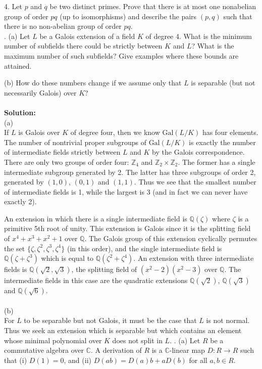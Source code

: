 \documentclass[11pt]{article}
\newcommand{\Z}{\mathbb{Z}}
\newcommand{\Q}{\mathbb{Q}}
\newcommand{\C}{\mathbb{C}}
\begin{document}
4. Let $p$ and $q$ be two distinct primes. Prove that there is at most one nonabelian
group of order $pq$ (up to isomorphisms) and describe the pairs $(p, q)$ such
that there is no non-abelian group of order $pq$.\\
. (a) Let $L$ be a Galois extension of a field $K$ of degree 4. What is the minimum
number of subfields there could be strictly between $K$ and $L$? What is the maximum
number of such subfields? Give examples where these bounds are attained.

(b) How do these numbers change if we assume only that $L$ is separable (but not
necessarily Galois) over $K$?\\\\
\textbf{Solution:}\\
(a)\\
If $L$ is Galois over $K$ of degree four, then we know $\mbox{Gal}(L/K)$ has four elements. The number of nontrivial proper subgroups of $\mbox{Gal}(L/K)$ is exactly the number of intermediate fields strictly between $L$ and $K$ by the Galois correspondence. There are only two groups of order four: $\Z_4$ and $\Z_2\times \Z_2$. The former has a single intermediate subgroup generated by 2. The latter has three subgroups of order 2, generated by $(1,0)$, $(0,1)$ and $(1,1)$. Thus we see that the smallest number of intermediate fields is 1, while the largest is 3 (and in fact we can never have exactly 2). 

An extension in which there is a single intermediate field is $\Q(\zeta)$ where $\zeta$ is a primitive 5th root of unity. This extension is Galois since it is the splitting field of $x^4+x^3+x^2+1$ over  $\Q$. The Galois group of this extension cyclically permutes the set $\{\zeta, \zeta^2,\zeta^3,\zeta^4\}$ (in this order), and the single intermediate field is $\Q(\zeta+\zeta^3)$ which is equal to $\Q(\zeta^2+\zeta^4)$. An extension with three intermediate fields is $\Q(\sqrt{2},\sqrt{3})$, the splitting field of $(x^2-2)(x^2-3)$ over $\Q$. The intermediate fields in this case are the quadratic extensions $\Q(\sqrt{2})$, $\Q(\sqrt{3})$ and $\Q(\sqrt{6})$.\\\\
(b)\\
For $L$ to be separable but not Galois, it must be the case that $L$ is not normal. Thus we seek an extension which is separable but which contains an element whose minimal polynomial over $K$ does not split in $L$. 
. (a) Let $R$ be a commutative algebra over $\C$. A derivation of $R$ is a $\C$-linear map $D:R\to R$ such that (i) $D(1) = 0$, and (ii) $D(ab) = D(a)b + aD(b)$ for all $a,b\in R$.
\end{document}

